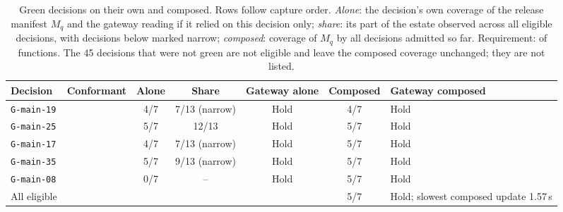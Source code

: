 \begin{table}[pos=t]
\centering\small
\caption{Green decisions on their own and composed. Rows follow capture order. \emph{Alone}: the decision's own coverage of the release manifest $M_q$ and the gateway reading if it relied on this decision only; \emph{share}: its part of the estate observed across all eligible decisions, with decisions below \FixTauRel{} marked narrow; \emph{composed}: coverage of $M_q$ by all decisions admitted so far. Requirement: \FixTauQ{} of \FixMq{} functions. The 45 decisions that were not green are not eligible and leave the composed coverage unchanged; they are not listed.}
\label{tab:coverage}
\begin{tabularx}{\textwidth}{@{}lcccccY@{}}
\toprule
Decision & Conformant & Alone & Share & Gateway alone & Composed & Gateway composed \\
\midrule
\texttt{G-main-19} & \Pass{} & 4/7 & 7/13 (narrow) & Hold & 4/7 & Hold \\
\texttt{G-main-25} & \Pass{} & 5/7 & 12/13 & Hold & 5/7 & Hold \\
\texttt{G-main-17} & \Pass{} & 4/7 & 7/13 (narrow) & Hold & 5/7 & Hold \\
\texttt{G-main-35} & \Pass{} & 5/7 & 9/13 (narrow) & Hold & 5/7 & Hold \\
\texttt{G-main-08} & \Fail{} & 0/7 & -- & Hold & 5/7 & Hold \\
\midrule
All eligible & & & & & 5/7 & Hold; slowest composed update 1.57\,s \\
\bottomrule
\end{tabularx}
\end{table}
